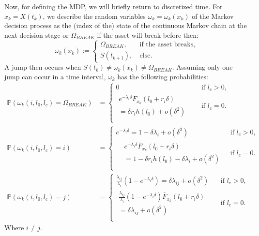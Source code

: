 Now, for defining the MDP, we will briefly return to discretized time.
For $x_k=X(t_k)$, we describe the random variables $\omega_k=\omega_k(x_k)$ of the Markov decision process as the (index of the) state of the continuous Markov chain at the next decision stage or $\Omega_{BREAK}$ if the asset will break before then:
\[
\omega_k(x_k):=\begin{cases}
\Omega_{BREAK},&\ \text{if the asset breaks,}\\
S(t_{k+1}),&\ \text{else.}
\end{cases}
\]
A jump then occurs when $S(t_k)\neq\omega_k(x_k)\neq\Omega_{BREAK}$.
Assuming only one jump can occur in a time interval, $\omega_k$ has the following probabilities:
\[
\begin{split}
\mathbb{P}(\omega_k(i,l_0,l_c)=\Omega_{BREAK})&=\begin{cases}
	0&\text{ if }l_c>0,\\
	\begin{split}
	e^{-\lambda_{i}\delta}F_{x_k}(l_0+r_i\delta)&\\
	=\delta r_ih(l_0)+o(\delta^2)&
	\end{split}&\text{ if }l_c=0.\\
\end{cases}\\
\mathbb{P}(\omega_k(i,l_0,l_c)=i)&=\begin{cases}
	e^{-\lambda_i \delta}=1-\delta\lambda_i+o(\delta^2)&\text{ if }l_c>0,\\
	\begin{split}
	&e^{-\lambda_i \delta} \bar{F}_{x_k}(l_0+r_i\delta)\\
	&=1-\delta r_ih(l_0)-\delta\lambda_i+o(\delta^2)
	\end{split}&\text{ if }l_c=0.\\
\end{cases}\\
\mathbb{P}(\omega_k(i,l_0,l_c)=j)&=\begin{cases}
	\frac{\lambda_{ij}}{\lambda_i}(1-e^{-\lambda_i \delta})=\delta\lambda_{ij}+o(\delta^2) & \text{ if }l_c>0,\\
	\begin{split}
	\frac{\lambda_{ij}}{\lambda_i}(1-e^{-\lambda_i \delta})\bar{F}_{x_k}(l_0+r_i\delta)&\\
	=\delta\lambda_{ij}+o(\delta^2)&
	\end{split}&\text{ if }l_c=0.\\
\end{cases}
\end{split}
\]
Where $i\neq j$.

